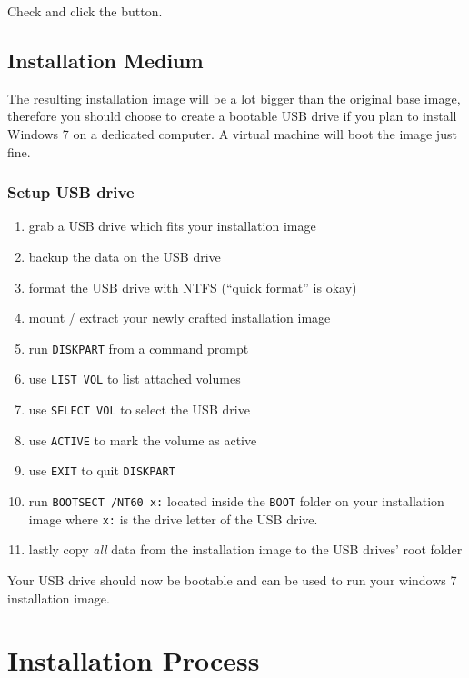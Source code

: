 \documentclass{itsarticle}
\begin{document}
Check  and click the
 button.

\subsection{Installation Medium}
\label{sub:medium}

The resulting installation image will be a lot bigger than the original base
image, therefore you should choose to create a bootable USB drive if you plan
to install Windows 7 on a dedicated computer. A virtual machine will boot the
image just fine.

\subsubsection{Setup USB drive}

\begin{enumerate}
    \item grab a USB drive which fits your installation image
    \item backup the data on the USB drive
    \item format the USB drive with NTFS (``quick format'' is okay)
    \item mount / extract your newly crafted installation image
    \item run \texttt{DISKPART} from a command prompt
    \item use \texttt{LIST VOL} to list attached volumes
    \item use \texttt{SELECT VOL} to select the USB drive
    \item use \texttt{ACTIVE} to mark the volume as active
    \item use \texttt{EXIT} to quit \texttt{DISKPART}
    \item run \texttt{BOOTSECT /NT60 x:} located inside the \texttt{BOOT}
        folder on your installation image where \texttt{x:} is the drive letter
        of the USB drive.
    \item lastly copy \emph{all} data from the installation image to the USB
        drives' root folder
\end{enumerate}

Your USB drive should now be bootable and can be used to run your windows 7
installation image.

\section{Installation Process}
\label{sec:installation}
\end{document}
